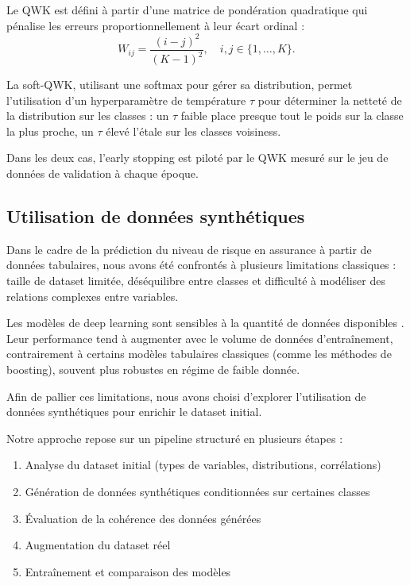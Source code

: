 \documentclass[conference]{IEEEtran}
\begin{document}
Le QWK est défini à partir d'une matrice de pondération quadratique qui pénalise
les erreurs proportionnellement à leur écart ordinal :
\begin{equation}
  W_{ij} = \frac{(i - j)^2}{(K-1)^2}, \quad i, j \in \{1, \ldots, K\}.
\end{equation}
 
La soft-QWK, utilisant une softmax pour gérer sa distribution, permet l'utilisation d'un hyperparamètre de température $\tau$ pour déterminer la netteté de la distribution sur les classes : un $\tau$ faible place presque tout le poids sur la classe la plus proche, un $\tau$ élevé l'étale sur les classes voisiness.
 
Dans les deux cas, l'early stopping est piloté par le
QWK mesuré sur le jeu de données de validation à chaque époque.

\subsection{Utilisation de données synthétiques}

Dans le cadre de la prédiction du niveau de risque en assurance à partir de données tabulaires, nous avons été confrontés à plusieurs limitations classiques : taille de dataset limitée, déséquilibre entre classes et difficulté à modéliser des relations complexes entre variables.

Les modèles de deep learning sont sensibles à la quantité de données disponibles \cite{goodfellow2016deep}. Leur performance tend à augmenter avec le volume de données d’entraînement, contrairement à certains modèles tabulaires classiques (comme les méthodes de boosting), souvent plus robustes en régime de faible donnée.

Afin de pallier ces limitations, nous avons choisi d’explorer l’utilisation de données synthétiques pour enrichir le dataset initial.

Notre approche repose sur un pipeline structuré en plusieurs étapes :

\begin{enumerate}
    \item Analyse du dataset initial (types de variables, distributions, corrélations)
    \item Génération de données synthétiques conditionnées sur certaines classes
    \item Évaluation de la cohérence des données générées
    \item Augmentation du dataset réel
    \item Entraînement et comparaison des modèles
\end{enumerate}
\end{document}

